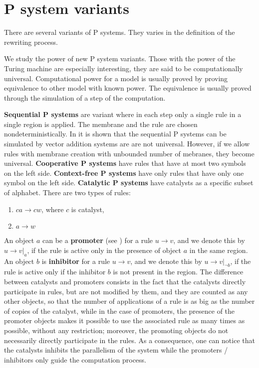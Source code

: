 \documentclass[a4paper,10pt]{article}
\begin{document}
\section{P system variants}
\label{sec:variants}

There are several variants of P systems. They varies in the definition of the rewriting process.

We study the power of new P system variants. Those with the power of the Turing machine are especially interesting, they are said to be computationally universal. Computational power for a model is usually proved by proving equivalence to other model with known power. The equivalence is usually proved through the simulation of a step of the computation.

{\bf Sequential P systems} are variant where in each step only a single rule in a single region is applied. The membrane and the rule are chosen nondeterministically. In \cite{Ibarra:2005:SPS:2111772.2111880} it is shown that the sequential P systems can be simulated by vector addition systems are are not universal. However, if we allow rules with membrane creation with unbounded number of mebranes, they become universal.
{\bf Cooperative P systems} have rules that have at most two symbols on the left side.
{\bf Context-free P systems} have only rules that have only one symbol on the left side.
{\bf Catalytic P systems} have catalysts as a specific subset of alphabet. There are two types of rules:

\begin{enumerate}
	\item $ca\rightarrow cw$, where $c$ is catalyst,
	\item $a\rightarrow w$
\end{enumerate}

An object $a$ can be a {\bf promoter} (see \cite{Ionescu:jucs_10_5:on_p_systems_with}) for a rule $u\rightarrow v$, and we denote this by $u\rightarrow v|_a$, if the rule is active only in the presence of object $a$ in the same region. An object $b$ is {\bf inhibitor} for a rule $u\rightarrow v$, and we denote this by $u\rightarrow v|_{\neg b}$, if the rule is active only if the inhibitor $b$ is not present in the region.
The difference between catalysts and promoters consists in the fact that the catalysts directly participate in rules, but are not modified by them, and they are counted as any other objects, so that the number of applications of a rule is as big as the number of copies of the catalyst, while in the case of promoters, the presence of the promoter objects makes it possible to use the associated rule as many times as possible, without any restriction; moreover, the promoting objects do not necessarily directly participate in the rules. As a consequence, one can notice that the catalysts inhibits the parallelism of the system while the promoters / inhibitors only guide the computation process.
\end{document}
